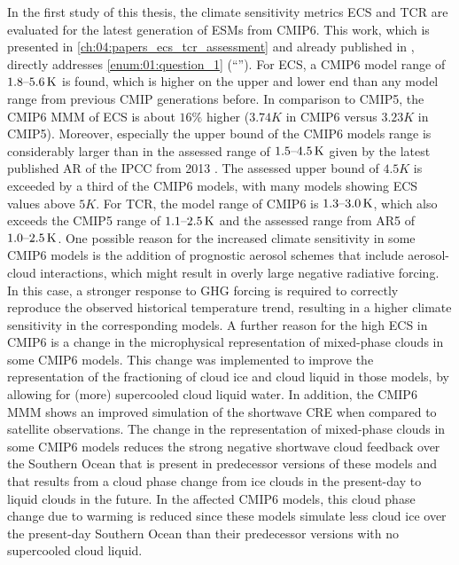 In the first study of this thesis, the climate sensitivity metrics \ac{ECS} and
\ac{TCR} are evaluated for the latest generation of \acp{ESM} from \acs{CMIP}6.
This work, which is presented in \cref{ch:04:papers_ecs_tcr_assessment} and
already published in \textcite{Bock2020, Meehl2020}, directly addresses
\cref{enum:01:question_1} (\enquote{\emph{\KeyScienceQuestionOne{}}}). For
\ac{ECS}, a \acs{CMIP}6 model range of $\rangeunit{1.8}{5.6}{K}$ is found,
which is higher on the upper and lower end than any model range from previous
\ac{CMIP} generations before. In comparison to \acs{CMIP}5, the \acs{CMIP}6
\ac{MMM} of \ac{ECS} is about $16 \unit{\%}$ higher ($3.74 \unit{K}$ in
\acs{CMIP}6 versus $3.23 \unit{K}$ in \acs{CMIP}5). Moreover, especially the
upper bound of the \acs{CMIP}6 models range is considerably larger than in the
assessed range of $\rangeunit{1.5}{4.5}{K}$ given by the latest published
\ac{AR} of the \ac{IPCC} from 2013 \autocite{Stocker2013}. The assessed upper
bound of $4.5 \unit{K}$ is exceeded by a third of the \acs{CMIP}6 models, with
many models showing \ac{ECS} values above $5 \unit{K}$. For \ac{TCR}, the model
range of \acs{CMIP}6 is $\rangeunit{1.3}{3.0}{K}$, which also exceeds the
\acs{CMIP}5 range of $\rangeunit{1.1}{2.5}{K}$ and the assessed range from
\acs{AR}5 of $\rangeunit{1.0}{2.5}{K}$. One possible reason for the increased
climate sensitivity in some \acs{CMIP}6 models is the addition of prognostic
aerosol schemes that include aerosol-cloud interactions, which might result in
overly large negative radiative forcing. In this case, a stronger response to
\ac{GHG} forcing is required to correctly reproduce the observed historical
temperature trend, resulting in a higher climate sensitivity in the
corresponding models. A further reason for the high \ac{ECS} in \acs{CMIP}6 is
a change in the microphysical representation of mixed-phase clouds in some
\acs{CMIP}6 models. This change was implemented to improve the representation
of the fractioning of cloud ice and cloud liquid in those models, \eg{} by
allowing for (more) supercooled cloud liquid water. In addition, the
\acs{CMIP}6 \ac{MMM} shows an improved simulation of the shortwave \ac{CRE}
when compared to satellite observations. The change in the representation of
mixed-phase clouds in some \acs{CMIP}6 models reduces the strong negative
shortwave cloud feedback over the Southern Ocean that is present in predecessor
versions of these models and that results from a cloud phase change from ice
clouds in the present-day to liquid clouds in the future. In the affected
\acs{CMIP}6 models, this cloud phase change due to warming is reduced since
these models simulate less cloud ice over the present-day Southern Ocean than
their predecessor versions with no supercooled cloud liquid.

